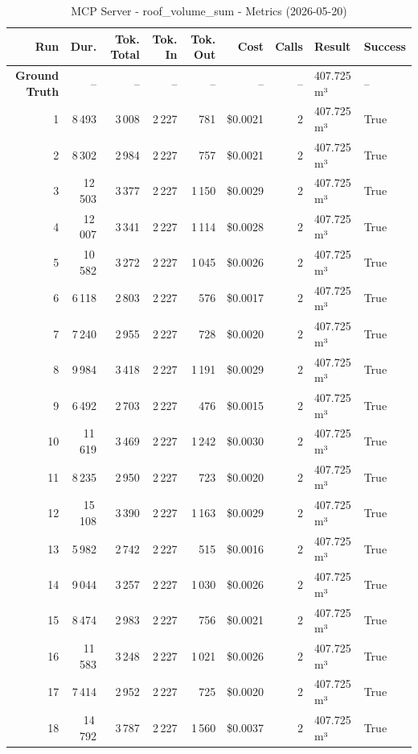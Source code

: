 \documentclass[a4paper,11pt]{article}
\begin{document}
\begin{table}[ht]
\centering
\scriptsize
\caption{MCP Server - roof\_volume\_sum - Metrics (2026-05-20)}
\label{tab:mcp\_roof\_volume\_sum\_metrics\_2026-05-20}
\begin{tabular}{r r r r r r r p{3cm} l}
\hline
Run & Dur. & Tok. Total & Tok. In & Tok. Out & Cost & Calls & Result & Success \\
\hline
\textbf{Ground Truth} & -- & -- & -- & -- & -- & -- & 407.725 m³ & -- \\
\hline
1 & 8\,493 & 3\,008 & 2\,227 & 781 & \$0.0021 & 2 & 407.725 m³ & True \\
2 & 8\,302 & 2\,984 & 2\,227 & 757 & \$0.0021 & 2 & 407.725 m³ & True \\
3 & 12\,503 & 3\,377 & 2\,227 & 1\,150 & \$0.0029 & 2 & 407.725 m³ & True \\
4 & 12\,007 & 3\,341 & 2\,227 & 1\,114 & \$0.0028 & 2 & 407.725 m³ & True \\
5 & 10\,582 & 3\,272 & 2\,227 & 1\,045 & \$0.0026 & 2 & 407.725 m³ & True \\
6 & 6\,118 & 2\,803 & 2\,227 & 576 & \$0.0017 & 2 & 407.725 m³ & True \\
7 & 7\,240 & 2\,955 & 2\,227 & 728 & \$0.0020 & 2 & 407.725 m³ & True \\
8 & 9\,984 & 3\,418 & 2\,227 & 1\,191 & \$0.0029 & 2 & 407.725 m³ & True \\
9 & 6\,492 & 2\,703 & 2\,227 & 476 & \$0.0015 & 2 & 407.725 m³ & True \\
10 & 11\,619 & 3\,469 & 2\,227 & 1\,242 & \$0.0030 & 2 & 407.725 m³ & True \\
11 & 8\,235 & 2\,950 & 2\,227 & 723 & \$0.0020 & 2 & 407.725 m³ & True \\
12 & 15\,108 & 3\,390 & 2\,227 & 1\,163 & \$0.0029 & 2 & 407.725 m³ & True \\
13 & 5\,982 & 2\,742 & 2\,227 & 515 & \$0.0016 & 2 & 407.725 m³ & True \\
14 & 9\,044 & 3\,257 & 2\,227 & 1\,030 & \$0.0026 & 2 & 407.725 m³ & True \\
15 & 8\,474 & 2\,983 & 2\,227 & 756 & \$0.0021 & 2 & 407.725 m³ & True \\
16 & 11\,583 & 3\,248 & 2\,227 & 1\,021 & \$0.0026 & 2 & 407.725 m³ & True \\
17 & 7\,414 & 2\,952 & 2\,227 & 725 & \$0.0020 & 2 & 407.725 m³ & True \\
18 & 14\,792 & 3\,787 & 2\,227 & 1\,560 & \$0.0037 & 2 & 407.725 m³ & True \\

\end{tabular}
\end{table}
\end{document}
